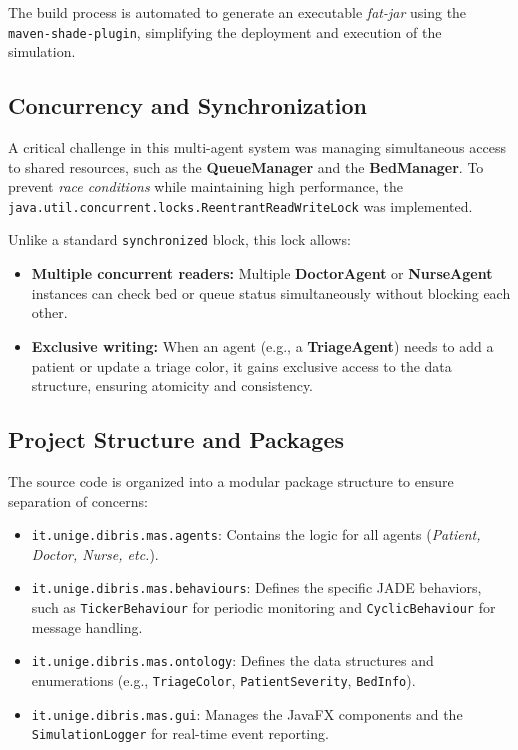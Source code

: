\documentclass{article}[12pt]
\begin{document}
\noindent
The build process is automated to generate an executable \textit{fat-jar} using the \texttt{maven-shade-plugin}, simplifying the deployment and execution of the simulation.

\subsection{Concurrency and Synchronization}
A critical challenge in this multi-agent system was managing simultaneous access to shared resources, such as the \textbf{QueueManager} and the \textbf{BedManager}. To prevent \textit{race conditions} while maintaining high performance, the \texttt{java.util.concurrent.locks.ReentrantReadWriteLock} was implemented.

\noindent
Unlike a standard \texttt{synchronized} block, this lock allows:
\begin{itemize}
    \item \textbf{Multiple concurrent readers:} Multiple \textbf{DoctorAgent} or \textbf{NurseAgent} instances can check bed or queue status simultaneously without blocking each other.
    \item \textbf{Exclusive writing:} When an agent (e.g., a \textbf{TriageAgent}) needs to add a patient or update a triage color, it gains exclusive access to the data structure, ensuring atomicity and consistency.
\end{itemize}

\subsection{Project Structure and Packages}
The source code is organized into a modular package structure to ensure separation of concerns:
\begin{itemize}
    \item \texttt{it.unige.dibris.mas.agents}: Contains the logic for all agents (\textit{Patient, Doctor, Nurse, etc.}).
    \item \texttt{it.unige.dibris.mas.behaviours}: Defines the specific JADE behaviors, such as \texttt{TickerBehaviour} for periodic monitoring and \texttt{CyclicBehaviour} for message handling.
    \item \texttt{it.unige.dibris.mas.ontology}: Defines the data structures and enumerations (e.g., \texttt{TriageColor}, \texttt{PatientSeverity}, \texttt{BedInfo}).
    \item \texttt{it.unige.dibris.mas.gui}: Manages the JavaFX components and the \texttt{SimulationLogger} for real-time event reporting.
\end{itemize}
\end{document}
